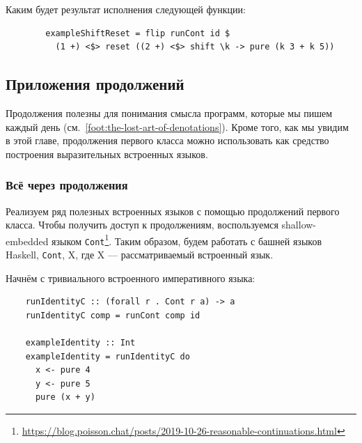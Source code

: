 \begin{task}
    Каким будет результат исполнения следующей функции:
    \begin{verbatim}
        exampleShiftReset = flip runCont id $
          (1 +) <$> reset ((2 +) <$> shift \k -> pure (k 3 + k 5))
    \end{verbatim}
\end{task}

\subsection{Приложения продолжений} \label{subsec:cont-applications}

Продолжения полезны для понимания смысла программ, которые мы пишем каждый день (см.\ \ref{foot:the-lost-art-of-denotations}).
Кроме того, как мы увидим в этой главе, продолжения первого класса можно использовать как средство построения выразительных встроенных языков.

\subsubsection{Всё через продолжения} \label{subsubsec:god-cont}

Реализуем ряд полезных встроенных языков с помощью продолжений первого класса.
Чтобы получить доступ к продолжениям, воспользуемся shallow-embedded языком \texttt{Cont}\footnote{\url{https://blog.poisson.chat/posts/2019-10-26-reasonable-continuations.html}}.
Таким образом, будем работать с башней языков Haskell, \texttt{Cont}, X, где X --- рассматриваемый встроенный язык.

Начнём с тривиального встроенного императивного языка:
\begin{verbatim}
    runIdentityC :: (forall r . Cont r a) -> a
    runIdentityC comp = runCont comp id

    exampleIdentity :: Int
    exampleIdentity = runIdentityC do
      x <- pure 4
      y <- pure 5
      pure (x + y)
\end{verbatim}

